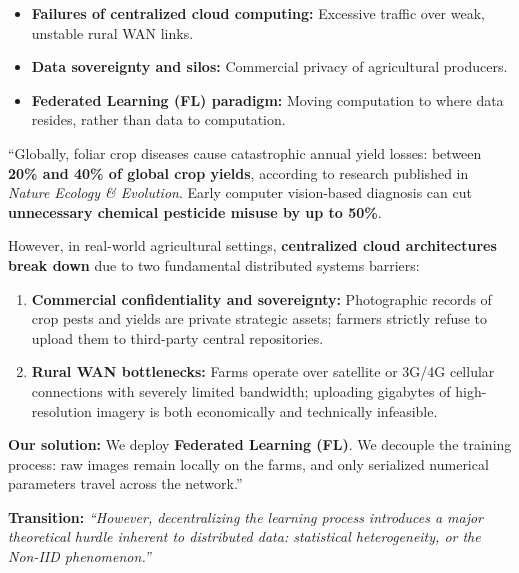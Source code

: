 \documentclass[11pt,a4paper]{article}
\begin{document}
\begin{tcolorbox}[colframe=primaryblue, title=\textbf{Key Distributed Systems Points to Emphasize}]
\begin{itemize}[leftmargin=*]
    \item \textbf{Failures of centralized cloud computing:} Excessive traffic over weak, unstable rural WAN links.
    \item \textbf{Data sovereignty and silos:} Commercial privacy of agricultural producers.
    \item \textbf{Federated Learning (FL) paradigm:} Moving computation to where data resides, rather than data to computation.
\end{itemize}
\end{tcolorbox}

\begin{tcolorbox}[colframe=darkgreen, title=\textbf{What to Say in the Presentation (Literal Script)}]
``Globally, foliar crop diseases cause catastrophic annual yield losses: between \textbf{20\% and 40\% of global crop yields}, according to research published in \textit{Nature Ecology \& Evolution}. Early computer vision-based diagnosis can cut \textbf{unnecessary chemical pesticide misuse by up to 50\%}.

However, in real-world agricultural settings, \textbf{centralized cloud architectures break down} due to two fundamental distributed systems barriers:
\begin{enumerate}
    \item \textbf{Commercial confidentiality and sovereignty:} Photographic records of crop pests and yields are private strategic assets; farmers strictly refuse to upload them to third-party central repositories.
    \item \textbf{Rural WAN bottlenecks:} Farms operate over satellite or 3G/4G cellular connections with severely limited bandwidth; uploading gigabytes of high-resolution imagery is both economically and technically infeasible.
\end{enumerate}

\textbf{Our solution:} We deploy \textbf{Federated Learning (FL)}. We decouple the training process: raw images remain locally on the farms, and only serialized numerical parameters travel across the network.''
\end{tcolorbox}

\textbf{Transition:} \textit{``However, decentralizing the learning process introduces a major theoretical hurdle inherent to distributed data: statistical heterogeneity, or the Non-IID phenomenon.''}
\end{document}
